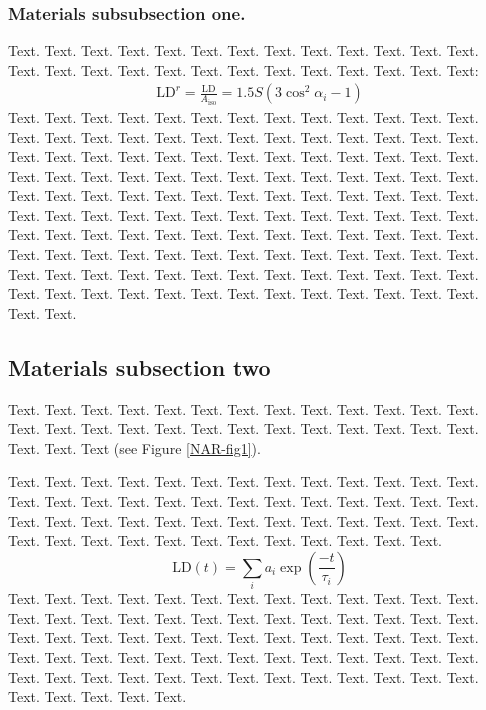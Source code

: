 \documentclass[a4,center,fleqn]{NAR}
\begin{document}
\subsubsection{Materials subsubsection one.}

Text. Text. Text. Text. Text. Text. Text. Text. Text. Text. Text.
Text. Text. Text. Text. Text. Text. Text. Text. Text. Text. Text.
Text. Text. Text. Text:
\begin{align}
\mathrm{LD}^r = \frac{\mathrm{LD}}{A_\mathrm{iso}}
= 1.5 S \left( 3 \cos^2 \alpha_i - 1 \right)
\end{align}
Text. Text. Text. Text. Text. Text. Text. Text. Text. Text. Text.
Text. Text. Text. Text. Text. Text. Text. Text. Text. Text. Text.
Text. Text. Text. Text. Text. Text. Text. Text. Text. Text. Text.
Text. Text. Text. Text. Text. Text. Text. Text. Text. Text. Text.
Text. Text. Text. Text. Text. Text. Text. Text. Text. Text. Text.
Text. Text. Text. Text. Text. Text. Text. Text. Text. Text. Text.
Text. Text. Text. Text. Text. Text. Text. Text. Text. Text. Text.
Text. Text. Text. Text. Text. Text. Text. Text. Text. Text. Text.
Text. Text. Text. Text. Text. Text. Text. Text. Text. Text. Text.
Text. Text. Text. Text. Text. Text. Text. Text. Text. Text. Text.
Text. Text. Text. Text. Text. Text. Text. Text. Text. Text. Text.
Text. Text. Text. Text. Text. Text. Text. Text. Text. Text. Text.


\subsection{Materials subsection two}

Text. Text. Text. Text. Text. Text. Text. Text. Text. Text. Text.
Text. Text. Text. Text. Text. Text. Text. Text. Text. Text. Text.
Text. Text. Text. Text. Text. Text. Text
(see Figure \ref{NAR-fig1}).

Text. Text. Text. Text. Text. Text. Text. Text. Text. Text. Text.
Text. Text. Text. Text. Text. Text. Text. Text. Text. Text. Text.
Text. Text. Text. Text. Text. Text. Text. Text. Text. Text. Text.
Text. Text. Text. Text. Text. Text. Text. Text. Text. Text. Text.
Text. Text. Text. Text. Text. Text. Text.
\begin{equation*}
\mathrm{LD} \left( t \right) =
\sum\limits_i
a_i \exp \left( \frac{-t}{\tau_i} \right)
\end{equation*}
Text. Text. Text. Text. Text. Text. Text. Text. Text. Text. Text.
Text. Text. Text. Text. Text. Text. Text. Text. Text. Text. Text.
Text. Text. Text. Text. Text. Text. Text. Text. Text. Text. Text.
Text. Text. Text. Text. Text. Text. Text. Text. Text. Text. Text.
Text. Text. Text. Text. Text. Text. Text. Text. Text. Text. Text.
Text. Text. Text. Text. Text. Text. Text. Text. Text. Text. Text.
Text. Text. Text. Text.
\end{document}
